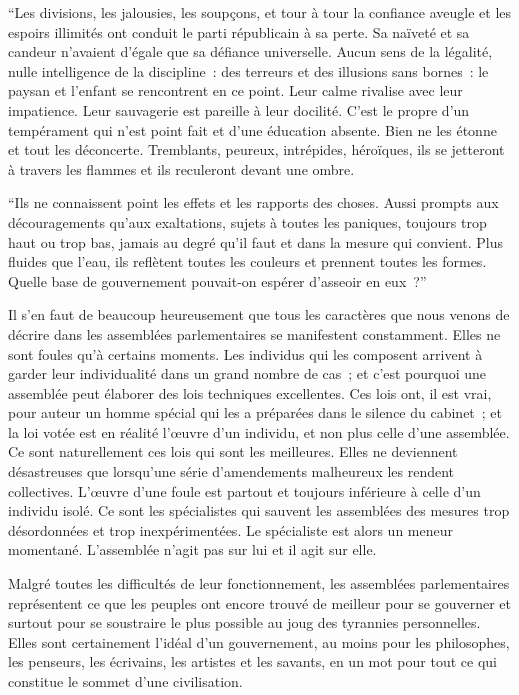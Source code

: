 \documentclass[french,twoside]{book} %
\begin{document}
“Les divisions, les jalousies, les soupçons, et tour à tour la confiance aveugle et les espoirs illimités ont conduit le parti républicain à sa perte. Sa naïveté et sa candeur n’avaient d’égale que sa défiance universelle. Aucun sens de la légalité, nulle intelli­gence de la discipline : des terreurs et des illusions sans bornes : le paysan et l’enfant se rencontrent en ce point. Leur calme rivalise avec leur impatience. Leur sauvagerie est pareille à leur docilité. C’est le propre d’un tempérament qui n’est point fait et d’une éducation absente. Bien ne les étonne et tout les déconcerte. Tremblants, peu­reux, intrépides, héroïques, ils se jetteront à travers les flammes et ils reculeront devant une ombre.\par
“Ils ne connaissent point les effets et les rapports des choses. Aussi prompts aux découragements qu’aux exaltations, sujets à toutes les paniques, toujours trop haut ou trop bas, jamais au degré qu’il faut et dans la mesure qui convient. Plus fluides que l’eau, ils reflètent toutes les couleurs et prennent toutes les formes. Quelle base de gouvernement pouvait-on espérer d’asseoir en eux ?”\par
Il s’en faut de beaucoup heureusement que tous les caractères que nous venons de décrire dans les assemblées parlementaires se manifestent constamment. Elles ne sont foules qu’à certains moments. Les individus qui les composent arrivent à garder leur individualité dans un grand nombre de cas ; et c’est pourquoi une assemblée peut élaborer des lois techniques excellentes. Ces lois ont, il est vrai, pour auteur un homme spécial qui les a préparées dans le silence du cabinet ; et la loi votée est en réalité l’œuvre d’un individu, et non plus celle d’une assemblée. Ce sont naturelle­ment ces lois qui sont les meilleures. Elles ne deviennent désastreuses que lorsqu’une série d’amendements malheureux les rendent collectives. L’œuvre d’une foule est partout et toujours inférieure à celle d’un individu isolé. Ce sont les spécialistes qui sauvent les assemblées des mesures trop désordonnées et trop inexpérimentées. Le spécialiste est alors un meneur momentané. L’assemblée n’agit pas sur lui et il agit sur elle.\par
Malgré toutes les difficultés de leur fonctionnement, les assemblées parlemen­taires représentent ce que les peuples ont encore trouvé de meilleur pour se gouver­ner et surtout pour se soustraire le plus possible au joug des tyrannies personnelles. Elles sont certainement l’idéal d’un gouvernement, au moins pour les philosophes, les penseurs, les écrivains, les artistes et les savants, en un mot pour tout ce qui constitue le sommet d’une civilisation.\par
\end{document}
